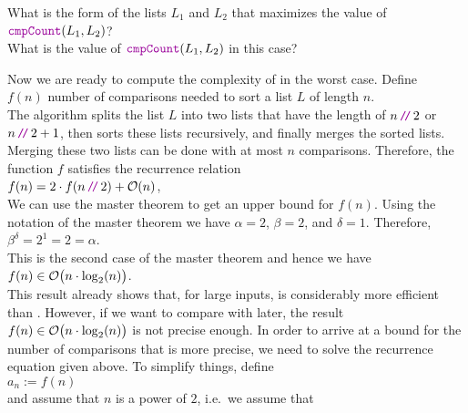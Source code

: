 \exercise
What is the form of the lists $L_1$ and $L_2$ that maximizes the value of 
\\[0.2cm]
\hspace*{1.3cm}
$\mytt{cmpCount}(L_1, L_2)$?
\\[0.2cm]
What is the value of $\mytt{cmpCount}(L_1, L_2)$ in this case? \eox
\vspace*{0.3cm}

\noindent
Now we are ready to compute the complexity of  in the worst case.  Define
\\[0.2cm]
\hspace*{1.3cm}
$f(n)$  \mytt{:=} number of comparisons needed to sort a list $L$ of length $n$.
\\[0.2cm]
The algorithm  
splits the list $L$ into two lists that have the length of $n\dv 2$ or $n\dv 2+1$, then sorts
these lists recursively, and finally merges the sorted lists.  Merging these two lists can be done with
at most $n$ comparisons.  Therefore, the function $f$ satisfies the recurrence relation
\\[0.2cm]
\hspace*{1.3cm}
$f(n) = 2 \cdot f(n \dv  2) + \Oh(n)$,
\\[0.2cm]
We can use the master theorem to get an upper bound for $f(n)$.  Using the notation of the master theorem we have
$\alpha = 2$, $\beta = 2$, and $\delta = 1$. Therefore,
\\[0.2cm]
\hspace*{1.3cm}
$\beta^\delta = 2^1 = 2 = \alpha$.
\\[0.2cm]
This is the second case of the master theorem and hence we have
\\[0.2cm]
\hspace*{1.3cm}
$f(n) \in \mathcal{O}\bigl(n \cdot \log_2(n) \bigr)$.
\\[0.2cm]
This result already shows that, for large inputs,  is considerably more efficient
than .  However, if we want to compare
 with  later, the result $f(n) \in \mathcal{O}\bigl(n \cdot \log_2(n) \bigr)$ is
not precise enough.  In order to arrive at a bound for the number of comparisons that is more precise,
we need to solve the recurrence equation given above.  To simplify things,  define
\\[0.2cm]
\hspace*{1.3cm}
$a_n := f(n)$ 
\\[0.2cm]
and assume that $n$ is a power of $2$, i.e.~we assume that
\\[0.2cm]
